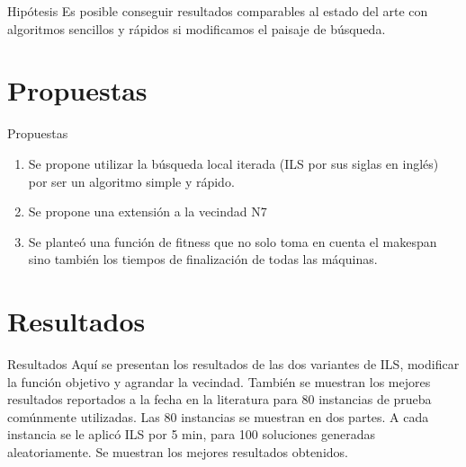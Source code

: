 \documentclass[11pt]{beamer}
\begin{document}
\begin{frame}{Hipótesis}
Es posible conseguir resultados comparables al estado del arte con algoritmos sencillos y rápidos si modificamos el paisaje de búsqueda.\\
\end{frame}

\section*{Propuestas}
\begin{frame}{Propuestas}
\begin{enumerate}
\item Se propone utilizar la búsqueda local iterada (ILS por sus siglas en inglés) por ser un algoritmo simple y rápido.
\item Se propone una extensión a la vecindad N7
\item Se planteó una función de fitness que no solo toma en  cuenta el makespan sino también los tiempos de finalización de todas las máquinas.
\end{enumerate}
\end{frame}
\section{Resultados}
\begin{frame}{Resultados}
Aquí se presentan los resultados de las dos variantes de ILS, modificar la función objetivo y agrandar la vecindad. También se muestran los mejores resultados reportados a la fecha en la literatura para 80 instancias de prueba comúnmente utilizadas. Las 80 instancias se muestran en dos partes. A cada instancia se le aplicó ILS por 5 min, para 100 soluciones generadas aleatoriamente. Se muestran los mejores resultados obtenidos.
\end{frame}
\end{document}
